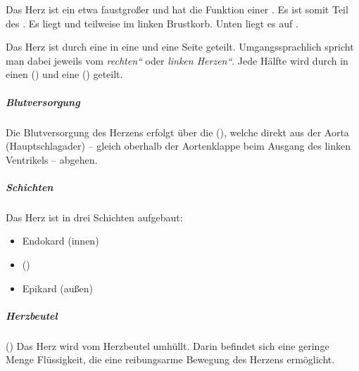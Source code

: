 \TextSlidePicture
{\TxBeschreibung}%
{%
Das Herz ist ein etwa faustgroßer  und hat die Funktion einer
. Es ist somit Teil des . 
Es liegt 
 und teilweise im linken Brustkorb.
Unten liegt es auf .

Das Herz ist durch eine 
  
in eine  
und eine  Seite geteilt.
%
Umgangssprachlich spricht man dabei jeweils vom
\emph{{\quotedblbase}rechten{\textquotedblleft}} oder
\emph{{\quotedblbase}linken Herzen{\textquotedblleft}}. Jede
Hälfte wird durch  in einen 
() und eine  ()
geteilt.

\subparagraph{Blutversorgung}

Die Blutversorgung des Herzens erfolgt über die
 (), welche direkt aus
der Aorta (Hauptschlagader) -- gleich oberhalb der
Aortenklappe beim Ausgang des linken Ventrikels -- abgehen.

\subparagraph{Schichten}

Das Herz ist in drei Schichten aufgebaut:
\begin{itemize}
\item Endokard (innen)      
\item {} ()  
\item Epikard (außen)  
\end{itemize}

\subparagraph{Herzbeutel} ()
Das Herz wird vom Herzbeutel umhüllt. 
Darin befindet sich eine geringe Menge
Flüssigkeit, die eine reibungsarme Bewegung des Herzens
ermöglicht. 
}%
